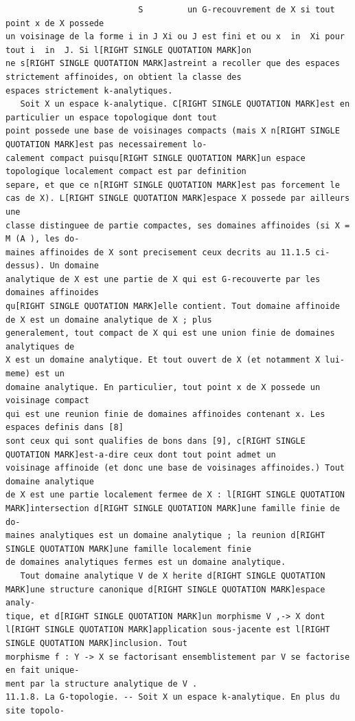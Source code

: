 \documentclass[
  11pt,
]{article}
\begin{document}
\begin{lstlisting}
                           S         un G-recouvrement de X si tout point x de X possede
un voisinage de la forme i in J Xi ou J est fini et ou x  in  Xi pour tout i  in  J. Si l[RIGHT SINGLE QUOTATION MARK]on
ne s[RIGHT SINGLE QUOTATION MARK]astreint a recoller que des espaces strictement affinoides, on obtient la classe des
espaces strictement k-analytiques.
   Soit X un espace k-analytique. C[RIGHT SINGLE QUOTATION MARK]est en particulier un espace topologique dont tout
point possede une base de voisinages compacts (mais X n[RIGHT SINGLE QUOTATION MARK]est pas necessairement lo-
calement compact puisqu[RIGHT SINGLE QUOTATION MARK]un espace topologique localement compact est par definition
separe, et que ce n[RIGHT SINGLE QUOTATION MARK]est pas forcement le cas de X). L[RIGHT SINGLE QUOTATION MARK]espace X possede par ailleurs une
classe distinguee de partie compactes, ses domaines affinoides (si X = M (A ), les do-
maines affinoides de X sont precisement ceux decrits au 11.1.5 ci-dessus). Un domaine
analytique de X est une partie de X qui est G-recouverte par les domaines affinoides
qu[RIGHT SINGLE QUOTATION MARK]elle contient. Tout domaine affinoide de X est un domaine analytique de X ; plus
generalement, tout compact de X qui est une union finie de domaines analytiques de
X est un domaine analytique. Et tout ouvert de X (et notamment X lui-meme) est un
domaine analytique. En particulier, tout point x de X possede un voisinage compact
qui est une reunion finie de domaines affinoides contenant x. Les espaces definis dans [8]
sont ceux qui sont qualifies de bons dans [9], c[RIGHT SINGLE QUOTATION MARK]est-a-dire ceux dont tout point admet un
voisinage affinoide (et donc une base de voisinages affinoides.) Tout domaine analytique
de X est une partie localement fermee de X : l[RIGHT SINGLE QUOTATION MARK]intersection d[RIGHT SINGLE QUOTATION MARK]une famille finie de do-
maines analytiques est un domaine analytique ; la reunion d[RIGHT SINGLE QUOTATION MARK]une famille localement finie
de domaines analytiques fermes est un domaine analytique.
   Tout domaine analytique V de X herite d[RIGHT SINGLE QUOTATION MARK]une structure canonique d[RIGHT SINGLE QUOTATION MARK]espace analy-
tique, et d[RIGHT SINGLE QUOTATION MARK]un morphisme V ,-> X dont l[RIGHT SINGLE QUOTATION MARK]application sous-jacente est l[RIGHT SINGLE QUOTATION MARK]inclusion. Tout
morphisme f : Y -> X se factorisant ensemblistement par V se factorise en fait unique-
ment par la structure analytique de V .
11.1.8. La G-topologie. -- Soit X un espace k-analytique. En plus du site topolo-

\end{lstlisting}
\end{document}
